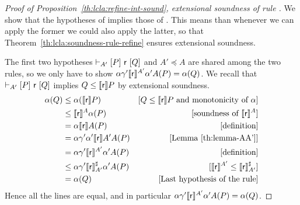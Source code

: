\begin{proof}[Proof of Proposition~\ref{th:lcla:refine-int-sound}, extensional soundness of rule ]
	We show that the hypotheses of  implies those of . This means than whenever we can apply the former we could also apply the latter, so that Theorem~\ref{th:lcla:soundness-rule-refine} ensures extensional soundness.

	The first two hypotheses $\vdash_{A'}\nobreak[P]~\mathsf{r}~[Q]$ and $A' \preceq A$ are shared among the two rules, so we only have to show $\alpha \gamma' \llbracket\mathsf{r}\rrbracket^{A'} \alpha' A(P) = \alpha(Q)$. We recall that $\vdash_{A'}\nobreak[P]~\mathsf{r}~[Q]$ implies $Q \le \llbracket\mathsf{r}\rrbracket P$ by extensional soundness.
	\begin{align*}
		\alpha(Q) & \le \alpha(\llbracket\mathsf{r}\rrbracket P )                                & [Q \le \llbracket\mathsf{r}\rrbracket P \text{ and monotonicity of }\alpha] \\
		          & \le \llbracket\mathsf{r}\rrbracket^{A} \alpha(P)                             & [\text{soundness of }\llbracket\mathsf{r}\rrbracket^{A}]                    \\
		          & = \alpha \llbracket\mathsf{r}\rrbracket A(P)                                 & [\text{definition}]                                        \\
		          & = \alpha \gamma' \alpha' \llbracket\mathsf{r}\rrbracket A' A(P)              & [\text{Lemma~\ref{th:lemma-AA'}}]                          \\
		          & = \alpha \gamma' \llbracket\mathsf{r}\rrbracket^{A'} \alpha' A(P)            & [\text{definition}]                                        \\
		          & \le \alpha \gamma' \llbracket\mathsf{r}\rrbracket^{\sharp}_{A'} \alpha' A(P) & [\llbracket\mathsf{r}\rrbracket^{A'} \le \llbracket\mathsf{r}\rrbracket^{\sharp}_{A'}]       \\
		          & = \alpha(Q)                                                 & [\text{Last hypothesis of the rule}]
	\end{align*}
	Hence all the lines are equal, and in particular $\alpha \gamma' \llbracket\mathsf{r}\rrbracket^{A'} \alpha' A(P) = \alpha(Q)$.
\end{proof}


